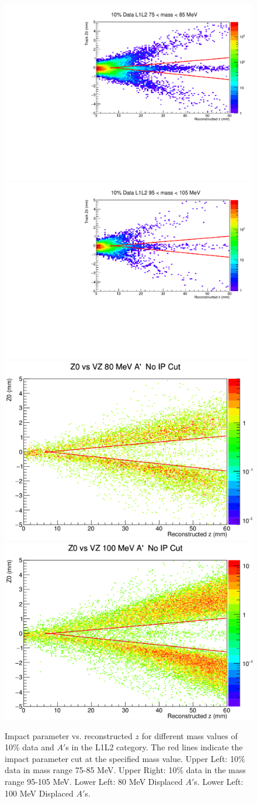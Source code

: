 \begin{figure}[t]
    \centering
    \includegraphics[width=.45\textwidth]{figs/selection/data_L1L2_80MeV_IP.pdf}
    \includegraphics[width=.45\textwidth]{figs/selection/data_L1L2_100MeV_IP.pdf}
    \includegraphics[width=.45\textwidth]{figs/selection/80MeV_L1L2_IP.png}
    \includegraphics[width=.45\textwidth]{figs/selection/100MeV_L1L2_IP.png}
    \caption{Impact parameter vs. reconstructed $z$ for different mass values of 10\% data and $A'$s in the L1L2 category. The red lines indicate the impact parameter cut at the specified mass value. Upper Left: 10\% data in mass range 75-85 MeV. Upper Right: 10\% data in the mass range 95-105 MeV. Lower Left: 80 MeV Displaced $A'$s. Lower Left: 100 MeV Displaced $A'$s.}
    \label{fig:z0_plots_L1L2}
\end{figure}

